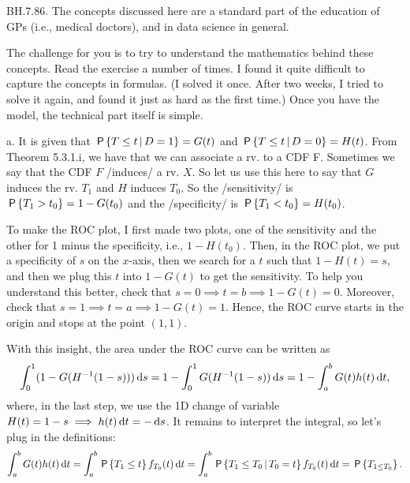 \begin{exercise}
BH.7.86. The concepts discussed here are a standard part of the education of GPs (i.e., medical doctors), and in data science in general.
\begin{hint}
The challenge for you is to try to understand the mathematics behind these concepts.
Read the exercise a number of times. I found it quite difficult to capture the concepts in formulas. (I solved it once. After two weeks,  I tried to solve it again, and found it just as hard as the first time.) Once you have the model, the technical part itself is simple.
\end{hint}
\begin{solution}
a. It is given that $\P{T\leq t\given D=1} = G(t)$ and $\P{T\leq t\given D=0} = H(t)$. From Theorem 5.3.1.i,  we have that we can associate a rv. to a CDF F. Sometimes we say that the CDF $F$ /induces/ a rv. $X$.  So let us use this here to say that $G$ induces the rv. $T_1$ and $H$ induces $T_0$.
So the /sensitivity/ is $\P{T_1>t_0} = 1-G(t_0)$ and the /specificity/ is $\P{T_1<t_0} = H(t_0)$.

To make the ROC plot, I first made two plots, one of the sensitivity and the other for 1 minus the specificity, i.e., $1-H(t_0)$.
Then, in the ROC plot, we put a specificity of $s$ on the \(x\)-axis, then we search for a $t$ such that $1-H(t) = s$, and then we plug this $t$ into $1-G(t)$ to get the sensitivity.
To help you understand this better, check that $s=0 \implies t = b \implies 1-G(t) = 0$.
Moreover, check that $s=1\implies t=a \implies 1- G(t) = 1$.
Hence, the ROC curve starts in the origin and stops at the point $(1,1)$.

With this insight, the area under the ROC curve can be written as
\begin{align*}
\int_0^1 (1-G(H^{-1}(1-s))) \d s  =
1 - \int_0^1 G(H^{-1}(1-s)) \d s  =
1 - \int_a^b G(t) h(t) \d t,
\end{align*}
where, in the last step, we use the 1D change of variable $H(t)=1-s \implies h(t) \d t = -\d s$. It remains to  interpret the integral, so let's plug in the definitions:
\begin{align*}
\int_a^b G(t) h(t) \d t =
\int_a^b \P{T_1\leq t} f_{T_0}(t) \d t =
\int_a^b \P{T_1\leq T_0\given T_0 = t} f_{T_0}(t) \d t =  \P{T_{1\leq T_0}}.
\end{align*}

\end{solution}
\end{exercise}


